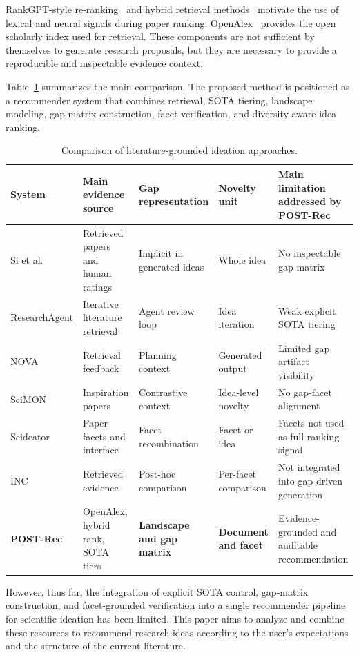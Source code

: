 \documentclass[preprint,12pt]{elsarticle}
\begin{document}
RankGPT-style re-ranking~\cite{sun2023rankgpt} and hybrid retrieval methods~\cite{zuccon2015integrating} motivate the use of lexical and neural signals during paper ranking. OpenAlex~\cite{priem2022openalex} provides the open scholarly index used for retrieval. These components are not sufficient by themselves to generate research proposals, but they are necessary to provide a reproducible and inspectable evidence context.

Table~\ref{tab:related} summarizes the main comparison. The proposed method is positioned as a recommender system that combines retrieval, SOTA tiering, landscape modeling, gap-matrix construction, facet verification, and diversity-aware idea ranking.

\begin{table}[t]
  \centering
  \caption{Comparison of literature-grounded ideation approaches.}
  \label{tab:related}
  \small
  \begin{tabular}{@{}p{2.3cm}p{2.7cm}p{2.6cm}p{2.4cm}p{2.5cm}@{}}
    \toprule
    \textbf{System} & \textbf{Main evidence source} & \textbf{Gap representation} & \textbf{Novelty unit} & \textbf{Main limitation addressed by POST-Rec} \\
    \midrule
    Si et al. & Retrieved papers and human ratings & Implicit in generated ideas & Whole idea & No inspectable gap matrix \\
    ResearchAgent & Iterative literature retrieval & Agent review loop & Idea iteration & Weak explicit SOTA tiering \\
    NOVA & Retrieval feedback & Planning context & Generated output & Limited gap artifact visibility \\
    SciMON & Inspiration papers & Contrastive context & Idea-level novelty & No gap-facet alignment \\
    Scideator & Paper facets and interface & Facet recombination & Facet or idea & Facets not used as full ranking signal \\
    INC & Retrieved evidence & Post-hoc comparison & Per-facet comparison & Not integrated into gap-driven generation \\
    \textbf{POST-Rec} & OpenAlex, hybrid rank, SOTA tiers & \textbf{Landscape and gap matrix} & \textbf{Document and facet} & Evidence-grounded and auditable recommendation \\
    \bottomrule
  \end{tabular}
\end{table}

However, thus far, the integration of explicit SOTA control, gap-matrix construction, and facet-grounded verification into a single recommender pipeline for scientific ideation has been limited. This paper aims to analyze and combine these resources to recommend research ideas according to the user's expectations and the structure of the current literature.
\end{document}
